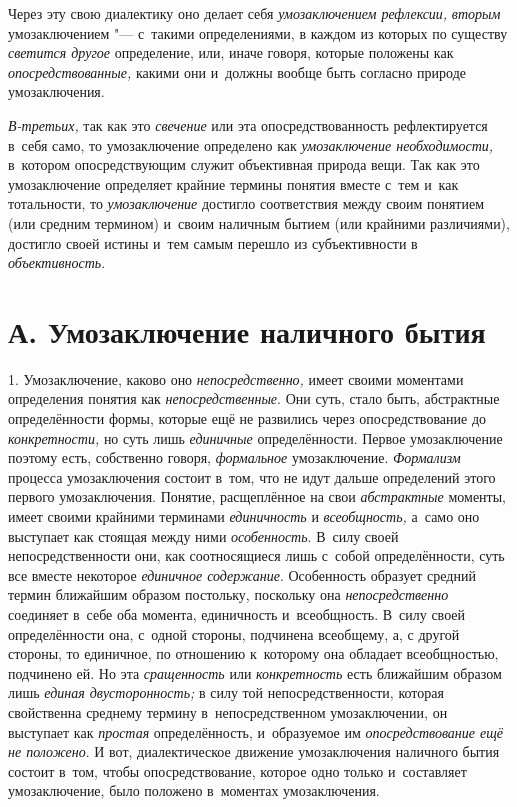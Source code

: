 Через эту свою диалектику оно делает себя
{\em умозаключением рефлексии,}
{\em вторым}
умозаключением "--- с~такими определениями, в
каждом из которых по существу
{\em светится другое}
определение, или, иначе говоря, которые положены как
{\em опосредствованные,}
какими они и~должны вообще быть согласно природе
умозаключения.

{\em В-третьих,} так как
это {\em свечение} или
эта опосредствованность рефлектируется в~себя само, то умозаключение
определено как {\em умозаключение
необходимости,} в~котором опосредствующим служит объективная
природа вещи. Так как это умозаключение определяет крайние термины понятия
вместе с~тем и~как тотальности, то
{\em умозаключение}
достигло соответствия между своим понятием (или средним
термином) и~своим наличным бытием (или крайними различиями), достигло своей
истины и~тем самым перешло из субъективности в
{\em объективность}.

\section[А. Умозаключение наличного бытия]{А. Умозаключение наличного бытия}

1. Умозаключение, каково оно
{\em непосредственно,}
имеет своими моментами определения понятия как
{\em непосредственные}.
Они суть, стало быть, абстрактные определённости формы,
которые ещё не развились через опосредствование до
{\em конкретности,} но
суть лишь {\em единичные}
определённости. Первое умозаключение поэтому есть,
собственно говоря,
{\em формальное}
умозаключение.
{\em Формализм} процесса
умозаключения состоит в~том, что не идут дальше определений этого первого
умозаключения. Понятие, расщеплённое на свои
{\em абстрактные}
моменты, имеет своими крайними терминами
{\em единичность} и
{\em всеобщность,} а~само
оно выступает как стоящая между ними
{\em особенность}. В~силу
своей непосредственности они, как соотносящиеся лишь с~собой
определённости, суть все вместе некоторое
{\em единичное содержание}.
Особенность образует средний термин ближайшим образом
постольку, поскольку она
{\em непосредственно}
соединяет в~себе оба момента, единичность и~всеобщность. В~силу своей
определённости она, с~одной стороны, подчинена всеобщему, а, с
другой стороны, то единичное, по отношению к~которому она обладает
всеобщностью, подчинено ей. Но эта {\em сращенность} или
{\em конкретность}
есть ближайшим образом лишь
{\em единая двусторонность;}
в силу той непосредственности, которая свойственна среднему
термину в~непосредственном умозаключении, он выступает как
{\em простая}
определённость, и~образуемое им
{\em опосредствование ещё не положено}.
И вот, диалектическое движение умозаключения наличного бытия
состоит в~том, чтобы опосредствование, которое одно только и~составляет
умозаключение, было положено в~моментах умозаключения.

